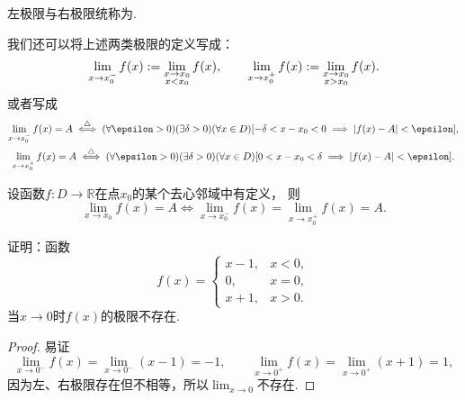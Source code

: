 左极限与右极限统称为.

\begin{remark}
我们还可以将上述两类极限的定义写成：\begin{gather*}
	\lim_{x \to x_0^-} f(x)
	:=
	\lim_{\substack{x \to x_0 \\ x < x_0}} f(x), \qquad
	\lim_{x \to x_0^+} f(x)
	:=
	\lim_{\substack{x \to x_0 \\ x > x_0}} f(x).
\end{gather*}
或者写成\begin{gather*}
	\lim_{x \to x_0^-} f(x) = A
	\defiff
	(\forall \epsilon > 0)
	(\exists \delta > 0)
	(\forall x \in D)
	[-\delta < x - x_0 < 0 \implies \abs{f(x) - A} < \epsilon], \\
	\lim_{x \to x_0^+} f(x) = A
	\defiff
	(\forall \epsilon > 0)
	(\exists \delta > 0)
	(\forall x \in D)
	[0 < x - x_0 < \delta \implies \abs{f(x) - A} < \epsilon].
\end{gather*}
\end{remark}

\begin{proposition}\label{theorem:函数极限.极限与单侧极限的关系1}
设函数\(f\colon D\to\mathbb{R}\)在点\(x_0\)的某个去心邻域中有定义，
则\[
	\lim_{x \to x_0} f(x) = A
	\iff
	\lim_{x \to x_0^-} f(x) = \lim_{x \to x_0^+} f(x) = A.
\]
\end{proposition}

\begin{example}
证明：函数\[
	f(x) = \left\{ \begin{array}{lc}
		x-1, & x<0, \\
		0, & x=0, \\
		x+1, & x>0.
	\end{array} \right.
\]当\(x\to0\)时\(f(x)\)的极限不存在.
\begin{proof}
易证\[
	\lim_{x\to0^-} f(x) = \lim_{x\to0^-} (x-1) = -1,
	\qquad
	\lim_{x\to0^+} f(x) = \lim_{x\to0^+} (x+1) = 1,
\]
因为左、右极限存在但不相等，所以\(\lim_{x\to0}\)不存在.
\end{proof}
\end{example}
